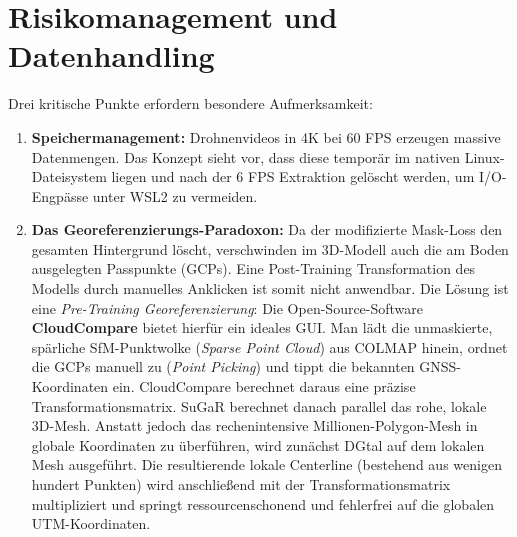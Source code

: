 \documentclass[12pt,a4paper]{article}
\begin{document}
\section{Risikomanagement und Datenhandling}
Drei kritische Punkte erfordern besondere Aufmerksamkeit:
\begin{enumerate}
    \item \textbf{Speichermanagement:} Drohnenvideos in 4K bei 60 FPS erzeugen massive Datenmengen. Das Konzept sieht vor, dass diese temporär im nativen Linux-Dateisystem liegen und nach der 6 FPS Extraktion gelöscht werden, um I/O-Engpässe unter WSL2 zu vermeiden.
    \item \textbf{Das Georeferenzierungs-Paradoxon:} Da der modifizierte Mask-Loss den gesamten Hintergrund löscht, verschwinden im 3D-Modell auch die am Boden ausgelegten Passpunkte (GCPs). Eine Post-Training Transformation des Modells durch manuelles Anklicken ist somit nicht anwendbar. Die Lösung ist eine \textit{Pre-Training Georeferenzierung}: Die Open-Source-Software \textbf{CloudCompare} bietet hierfür ein ideales GUI. Man lädt die unmaskierte, spärliche SfM-Punktwolke (\textit{Sparse Point Cloud}) aus COLMAP hinein, ordnet die GCPs manuell zu (\textit{Point Picking}) und tippt die bekannten GNSS-Koordinaten ein. CloudCompare berechnet daraus eine präzise Transformationsmatrix. SuGaR berechnet danach parallel das rohe, lokale 3D-Mesh. Anstatt jedoch das rechenintensive Millionen-Polygon-Mesh in globale Koordinaten zu überführen, wird zunächst DGtal auf dem lokalen Mesh ausgeführt. Die resultierende lokale Centerline (bestehend aus wenigen hundert Punkten) wird anschließend mit der Transformationsmatrix multipliziert und springt ressourcenschonend und fehlerfrei auf die globalen UTM-Koordinaten.


\end{enumerate}
\end{document}
